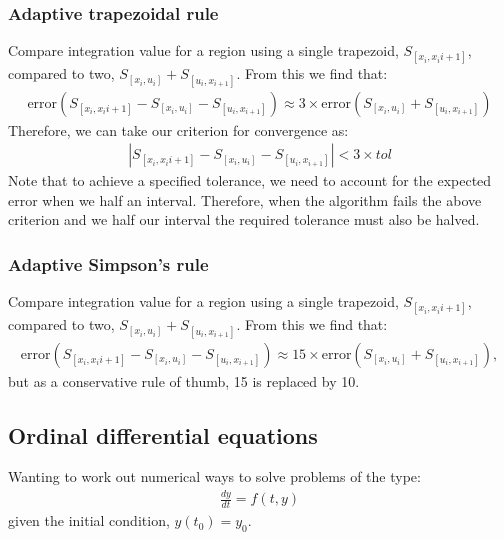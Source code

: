 \documentclass[11pt,a4paper]{report}
\begin{document}
    	\subsubsection{Adaptive trapezoidal rule}
    		Compare integration value for a region using a single trapezoid, $S_{[x_i,x_i{i+1}]}$, compared to two, $S_{[x_i,u_i]} + S_{[u_i,x_{i+1}]}$. From this we find that:
    		\begin{align}
    			\text{error}(S_{[x_i,x_i{i+1}]} - S_{[x_i,u_i]} - S_{[u_i,x_{i+1}]}) \approx 3\times \text{error} (S_{[x_i,u_i]} + S_{[u_i,x_{i+1}]})
    		\end{align}
    		Therefore, we can take our criterion for convergence as:
    		\begin{align}
    			| S_{[x_i,x_i{i+1}]} - S_{[x_i,u_i]} - S_{[u_i,x_{i+1}]} | < 3\times tol
    		\end{align}
    		Note that to achieve a specified tolerance, we need to account for the expected error when we half an interval. Therefore, when the algorithm fails the above criterion and we half our interval the required tolerance must also be halved.
    		
		\subsubsection{Adaptive Simpson's rule}
		    Compare integration value for a region using a single trapezoid, $S_{[x_i,x_i{i+1}]}$, compared to two, $S_{[x_i,u_i]} + S_{[u_i,x_{i+1}]}$. From this we find that:
			\begin{align}
				\text{error}(S_{[x_i,x_i{i+1}]} - S_{[x_i,u_i]} - S_{[u_i,x_{i+1}]}) \approx 15\times \text{error} (S_{[x_i,u_i]} + S_{[u_i,x_{i+1}]}),
			\end{align}
			but as a conservative rule of thumb, 15 is replaced by 10.
			
	\subsection{Ordinal differential equations}
			Wanting to work out numerical ways to solve problems of the type:
			\begin{align}
				\frac{dy}{dt} = f(t,y)
			\end{align}
			given the initial condition, $y(t_0)=y_0$. \\
			
\end{document}
